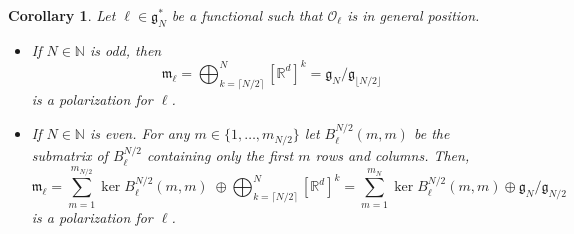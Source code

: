 \documentclass[pdflatex,sn-mathphys-num]{sn-jnl}
\theoremstyle{thmstyletwo}
\theoremstyle{thmstyleone}
\newtheorem{corollary}[definition]{Corollary}
\theoremstyle{thmstyletwo}
\newcommand{\fancyg}{\mathfrak{g}}
\newcommand{\fancym}{\mathfrak{m}}
\begin{document}
	\begin{corollary}\label{cor: explicit polarization}
		Let $\ell \in \fancyg_N^*$ be a functional such that $\mathcal{O}_{\ell}$ is in general position.
		\begin{itemize}
			\item[i)] If $N \in \mathbb{N}$ is odd, then 
			$$\fancym_{\ell} = \bigoplus_{k=\lceil N/2 \rceil}^N [\mathbb{R}^d]^k = \fancyg_N/\fancyg_{\lfloor N/2\rfloor}$$
			is a polarization for $\ell$.
			\item[ii)]  If $N \in \mathbb{N}$ is even. For any $m \in \{1,\ldots,m_{N/2}\}$ let $B_{\ell}^{N/2}(m,m)$ be the submatrix of $B_{\ell}^{N/2}$ containing only the first $m$ rows and columns. Then, 
			$$\fancym_{\ell} = \sum_{m=1}^{m_{N/2}}\ker B_{\ell}^{N/2}(m,m) \; \oplus \bigoplus_{k=\lceil N/2 \rceil}^N [\mathbb{R}^d]^k = \sum_{m=1}^{m_N}\ker B_{\ell}^{N/2}(m,m) \oplus \fancyg_N/\fancyg_{N/2}$$
			is a polarization for $\ell$.
		\end{itemize}
	\end{corollary}
\end{document}
